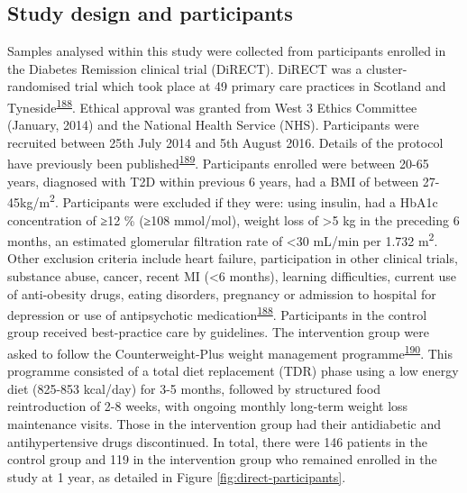 \documentclass[11pt,twoside]{bristolthesis}
\begin{document}
\hypertarget{study-design-and-participants}{%
\subsection{Study design and participants}\label{study-design-and-participants}}

Samples analysed within this study were collected from participants enrolled in the Diabetes Remission clinical trial (DiRECT). DiRECT was a cluster-randomised trial which took place at 49 primary care practices in Scotland and Tyneside\textsuperscript{\protect\hyperlink{ref-Lean2018}{188}}. Ethical approval was granted from West 3 Ethics Committee (January, 2014) and the National Health Service (NHS). Participants were recruited between 25th July 2014 and 5th August 2016. Details of the protocol have previously been published\textsuperscript{\protect\hyperlink{ref-Leslie2016}{189}}. Participants enrolled were between 20-65 years, diagnosed with T2D within previous 6 years, had a BMI of between 27-45kg/m\textsuperscript{2}. Participants were excluded if they were: using insulin, had a HbA1c concentration of ≥12 \% (≥108 mmol/mol), weight loss of \textgreater5 kg in the preceding 6 months, an estimated glomerular filtration rate of \textless30 mL/min per 1.732 m\textsuperscript{2}. Other exclusion criteria include heart failure, participation in other clinical trials, substance abuse, cancer, recent MI (\textless6 months), learning difficulties, current use of anti-obesity drugs, eating disorders, pregnancy or admission to hospital for depression or use of antipsychotic medication\textsuperscript{\protect\hyperlink{ref-Lean2018}{188}}. Participants in the control group received best-practice care by guidelines. The intervention group were asked to follow the Counterweight-Plus weight management programme\textsuperscript{\protect\hyperlink{ref-Lean2013}{190}}. This programme consisted of a total diet replacement (TDR) phase using a low energy diet (825-853 kcal/day) for 3-5 months, followed by structured food reintroduction of 2-8 weeks, with ongoing monthly long-term weight loss maintenance visits. Those in the intervention group had their antidiabetic and antihypertensive drugs discontinued. In total, there were 146 patients in the control group and 119 in the intervention group who remained enrolled in the study at 1 year, as detailed in Figure \ref{fig:direct-participants}.
\end{document}
